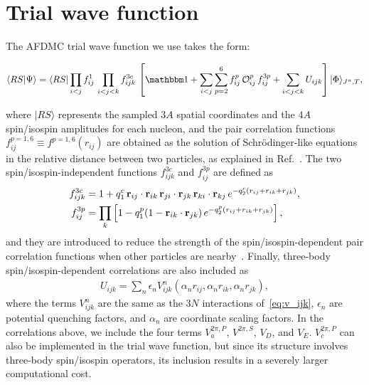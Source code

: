 \documentclass[aps,prc,twocolumn,superscriptaddress,floatfix]{revtex4-1}
\begin{document}
\section{Trial wave function}
\label{sec:wf}
The AFDMC trial wave function we use takes the form:
\begin{widetext}
\begin{align}
\langle RS|\Psi\rangle=\langle RS|\prod_{i<j}f^1_{ij}\,\prod_{i<j<k}f^{3c}_{ijk}\,
\left[\mathbbm1+\sum_{i<j}\sum_{p=2}^6 f^p_{ij}\,\mathcal O_{ij}^p\, f_{ij}^{3p}
+\sum_{i<j<k}U_{ijk}\right]|\Phi\rangle_{J^\pi,T} ,
\label{eq:psi}
\end{align}
\end{widetext}
where $|RS\rangle$ represents the sampled $3A$ spatial coordinates and the $4A$ spin/isospin amplitudes
for each nucleon, and the pair correlation functions $f^{p=1,6}_{ij}\equiv f^{p=1,6}(r_{ij})$ are obtained as the solution
of Schr\"odinger-like equations in the relative distance between two particles, as explained in Ref.~\cite{Carlson:2015}. 
The two spin/isospin-independent functions $f^{3c}_{ijk}$ and $f^{3p}_{ij}$ are defined as
\begin{align}
f^{3c}_{ijk}&=1+q_1^c\,\vb{r}_{ij}\cdot\vb{r}_{ik}\,\vb{r}_{ji}\cdot\vb{r}_{jk}\,
\vb{r}_{ki}\cdot\vb{r}_{kj}\,e^{-q_2^c(r_{ij}+r_{ik}+r_{jk})} ,
\nonumber \\
f_{ij}^{3p}&=\prod_k\left[1-q_1^p(1-\vb{r}_{ik}\cdot\vb{r}_{jk})\,e^{-q_2^p(r_{ij}+r_{ik}+r_{jk})}\right] ,
\end{align}
and they are introduced to reduce the strength of the spin/isospin-dependent pair correlation functions when 
other particles are nearby~\cite{Pudliner:1997}.
Finally, three-body spin/isospin-dependent correlations are also included as 
\begin{align}
U_{ijk}=\sum_n \epsilon_n V_{ijk}^n(\alpha_n r_{ij},\alpha_n r_{ik},\alpha_n r_{jk}) ,
\end{align}
where the terms $V^n_{ijk}$ are the same as the $3N$ interactions of~\cref{eq:v_ijk}, 
$\epsilon_n$ are potential quenching factors, and $\alpha_n$ are coordinate scaling factors.
In the correlations above, we include the four terms $V_a^{2\pi,P}$, $V^{2\pi,S}$,
$V_D$, and $V_E$. $V_c^{2\pi,P}$ can also be implemented in the trial wave function,
but since its structure involves three-body spin/isospin operators, its inclusion 
results in a severely larger computational cost.
\end{document}
